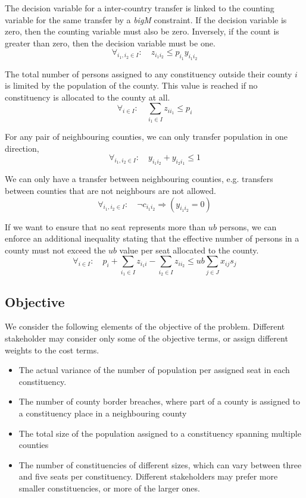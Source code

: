 \documentclass[runningheads]{llncs}
\begin{document}
The decision variable for a inter-country transfer is linked to the counting variable for the same transfer by a \emph{bigM} constraint. If the decision variable is zero, then the counting variable must also be zero. Inversely, if the count is greater than zero, then the decision variable must be one.
\begin{equation}
\forall_{i_1,i_2 \in I}:\quad z_{i_1i_2} \leq p_{i_1}y_{i_1i_2} 
\end{equation}

The total number of persons assigned to any constituency outside their county $i$ is limited by the population of the county. This value is reached if no constituency is allocated to the county at all.
\begin{equation}
\forall_{i \in I}:\quad \sum_{i_1 \in I} z_{ii_1} \leq p_{i}
\end{equation}

For any pair of neighbouring counties, we can only transfer population in one direction, 
\begin{equation}
\forall_{i_1,i_2 \in I}:\quad y_{i_1i_2} + y_{i_2i_1} \leq 1
\end{equation}

We can only have a transfer between neighbouring counties, e.g. transfers between counties that are not neighbours are not allowed.
\begin{equation}
\forall_{i_1,i_2 \in I}:\quad \neg c_{i_1i_2} \Rightarrow (y_{i_1i_2}  = 0)
\end{equation}

If we want to ensure that no seat represents more than $ub$ persons, we can enforce an additional inequality stating that the effective number of persons in a county must not exceed the $ub$ value per seat allocated to the county. 
\begin{equation}
\forall_{i \in I}:\quad p_{i}+\sum_{i_1 \in I} z_{i_1i} - \sum_{i_2 \in I} z_{ii_2}\leq ub\sum_{j \in J} x_{ij}s_{j}
\end{equation}


\subsection{Objective}

We consider the following elements of the objective of the problem. Different stakeholder may consider only some of the objective terms, or assign different weights to the cost terms.

\begin{itemize}
\item The actual variance of the number of population per assigned seat in each constituency.
\item The number of county border breaches, where part of a county is assigned to a constituency place in a neighbouring county
\item The total size of the population assigned to a constituency spanning multiple counties
\item The number of constituencies of different sizes, which can vary between three and five seats per constituency. Different stakeholders may prefer more smaller constituencies, or more of the larger ones. 
\end{itemize}
\end{document}
